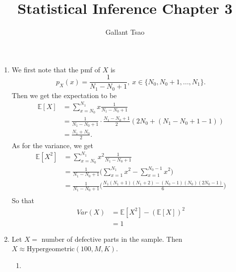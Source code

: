\documentclass{article}
\title{Statistical Inference Chapter 3}
\author{Gallant Tsao}
\begin{document}
\maketitle

\begin{enumerate}
    \item We first note that the pmf of $X$ is 
    \[ p_X(x) = \frac{1}{N_1 - N_0 + 1}, \ x \in \{N_0, N_0 + 1, ..., N_1\}. \]
    Then we get the expectation to be 
    \begin{align*}
        \mathbb{E}[X]
        &= \sum_{x = N_0}^{N_1} x\frac{1}{N_1 - N_0 + 1} \\
        &= \frac{1}{N_1 - N_0 + 1} \cdot \frac{N_1 - N_0 + 1}{2} (2N_0 + (N_1 - N_0 + 1 - 1)) \\
        &= \frac{N_1 + N_0}{2}.
    \end{align*}
    As for the variance, we get 
    \begin{align*}
        \mathbb{E}[X^2]
        &= \sum_{x = N_0}^{N_1} x^2 \frac{1}{N_1 - N_0 + 1} \\ 
        &= \frac{1}{N_1 - N_0 + 1} \Big( \sum_{x = 1}^{N_1}x^2 - \sum_{x = 1}^{N_0 - 1} x^2 \Big) \\
        &= \frac{1}{N_1 - N_0 + 1} \Big( \frac{N_1(N_1 + 1)(N_1 + 2) - (N_0 - 1)(N_0)(2N_0 - 1)}{6} \Big) \\
    \end{align*}
    So that 
    \begin{align*}
        Var(X)
        &= \mathbb{E}[X^2] - (\mathbb{E}[X])^2 \\
        &= 1
    \end{align*}

    \item Let $X = $ number of defective parts in the sample. Then \\
    $X \approx \text{Hypergeometric}(100, M, K)$.
    \begin{enumerate}
        \item 
    \end{enumerate}
\end{enumerate}
\end{document}
